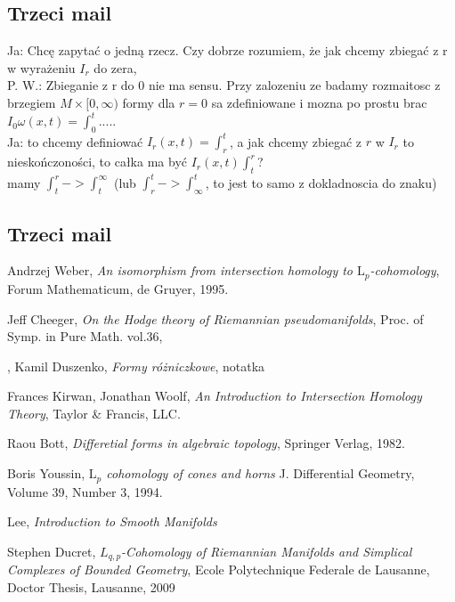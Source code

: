 \documentclass[licencjacka]{pracamgr}
\theoremstyle{definition}
\theoremstyle{definition}
\theoremstyle{plain}
\theoremstyle{plain}
\theoremstyle{plain}
\begin{document}
\subsection{Trzeci mail}

Ja: Chcę zapytać o jedną rzecz. Czy dobrze rozumiem, że jak chcemy zbiegać z r w
wyrażeniu $I_r$ do zera, \\

P. W.:
Zbieganie z r do 0 nie ma sensu. Przy zalozeniu ze badamy rozmaitosc z brzegiem
$M \times [0,\infty)$ formy dla $r=0$ sa zdefiniowane i mozna po prostu brac
    $I_0\omega(x,t)=\int_0^t .....$ \\

Ja: to chcemy definiować $I_r (x,t) = \int_r^t$, a jak
chcemy zbiegać z $r$ w $I_r$ to nieskończoności, to całka ma być $I_r(x,t) \int_t^r $? \\

mamy $ \int_t^r -> \int_t^\infty$
(lub  $\int_r^t -> \int_\infty^t$, to jest to samo z dokladnoscia do znaku) \\




\subsection{Trzeci mail}




\begin{thebibliography}{99}

 Andrzej Weber, \textit{An isomorphism from
  intersection homology to $\mathrm{L}_p$-cohomology}, Forum
  Mathematicum, de Gruyer, 1995.
  
 Jeff Cheeger, \textit{On the Hodge theory
  of Riemannian pseudomanifolds}, Proc. of Symp. in Pure Math. vol.36,

, Kamil Duszenko, \textit{Formy różniczkowe},
notatka

 Frances Kirwan, Jonathan Woolf, \textit{An Introduction
to Intersection Homology Theory}, Taylor \& Francis, LLC.

 Raou Bott, \textit{Differetial forms in algebraic
  topology}, Springer Verlag, 1982.

 Boris Youssin, \textit{$\mathrm{L}_p$
  cohomology of cones and horns } J. Differential Geometry, Volume 39,
  Number 3, 1994.
  
 Lee, \textit{Introduction to Smooth Manifolds}

 Stephen Ducret, \textit{$L_{q,p}$-Cohomology of Riemannian
    Manifolds and Simplical Complexes of Bounded Geometry}, Ecole Polytechnique Federale
    de Lausanne, Doctor Thesis, Lausanne, 2009

\end{thebibliography}
\end{document}
